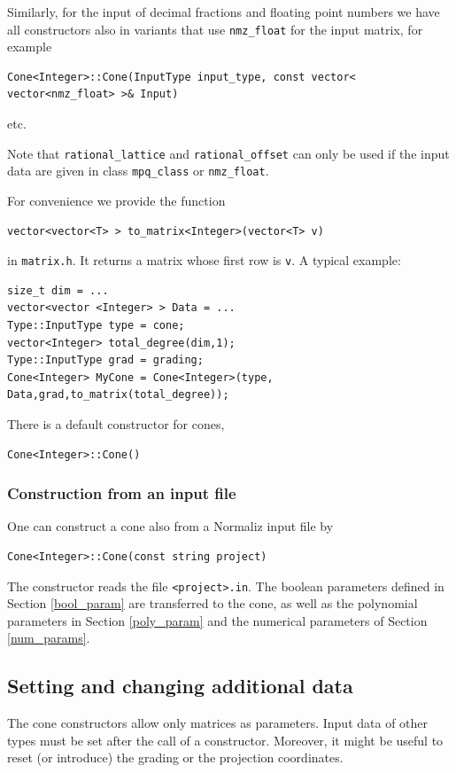 \begin{small}
Similarly, for the input of decimal fractions and floating point numbers we have all constructors also in variants that use \verb|nmz_float| for the input matrix, for example
\begin{Verbatim}
Cone<Integer>::Cone(InputType input_type, const vector< vector<nmz_float> >& Input)
\end{Verbatim}
etc.

Note that \verb|rational_lattice| and \verb|rational_offset| can only be used if the input data are given in class \verb|mpq_class| or \verb|nmz_float|.

For convenience we provide the function
\begin{Verbatim}
vector<vector<T> > to_matrix<Integer>(vector<T> v)
\end{Verbatim}
in \verb|matrix.h|. It returns a matrix whose first row is \verb|v|. A typical example:
\begin{Verbatim}
size_t dim = ...
vector<vector <Integer> > Data = ...
Type::InputType type = cone;
vector<Integer> total_degree(dim,1);
Type::InputType grad = grading;
Cone<Integer> MyCone = Cone<Integer>(type, Data,grad,to_matrix(total_degree));
\end{Verbatim}

There is a default constructor for cones,
\begin{Verbatim}
Cone<Integer>::Cone()
\end{Verbatim}

\subsubsection{Construction from an input file}

One can construct a cone also from a Normaliz input file by
\begin{Verbatim}
Cone<Integer>::Cone(const string project)
\end{Verbatim}
The constructor reads the file \verb|<project>.in|. The boolean parameters defined in Section \ref{bool_param} are transferred to the cone, as well as the polynomial parameters in Section \ref{poly_param} and the numerical parameters of Section \ref{num_params}.

\subsection{Setting and changing additional data}

The cone constructors allow only matrices as parameters. Input data of other types must be set after the call of a constructor. Moreover, it might be useful to reset (or introduce) the grading or the projection coordinates.


\end{small}
